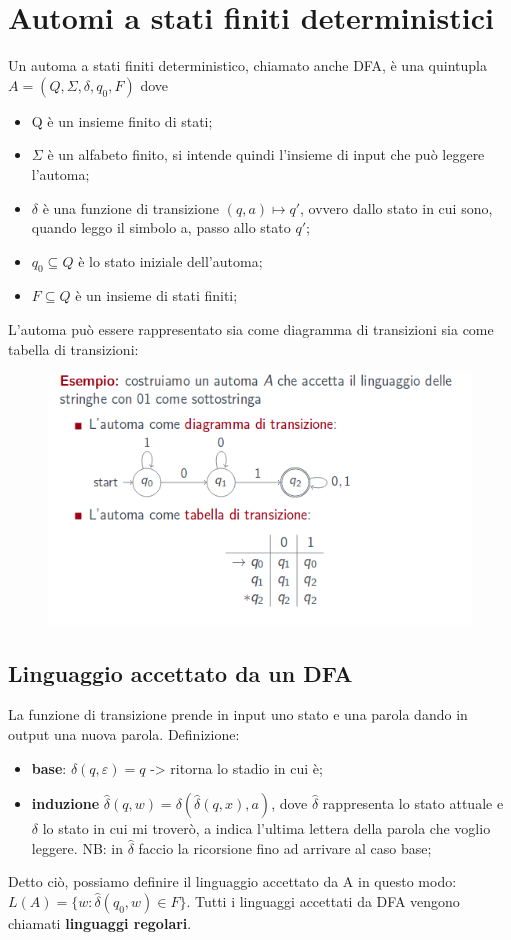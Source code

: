 \chapter{Automi a stati finiti deterministici}
Un automa a stati finiti deterministico, chiamato anche DFA, è una quintupla
$A=(Q, \Sigma, \delta, q_0, F)$ dove
\begin{itemize}
\item Q è un insieme finito di stati;
\item $\Sigma$ è un alfabeto finito, si intende quindi l'insieme di
input che può leggere l'automa;
\item $\delta$ è una funzione di transizione $(q,a) \mapsto q'$, ovvero 
dallo stato in cui sono, quando leggo il simbolo a, passo allo stato $q'$;
\item $q_0 \subseteq Q$ è lo stato iniziale dell'automa;
\item $F \subseteq Q$ è un insieme di stati finiti;
\end{itemize}
L'automa può essere rappresentato sia come diagramma di transizioni sia come tabella
di transizioni: 

\begin{figure}[h]
\centering 
\includegraphics[scale=0.5]{Immagini/DFA.png}
\end{figure}

\section{Linguaggio accettato da un DFA} 
La funzione di transizione prende in input uno stato e una parola dando in output
una nuova parola. Definizione:
\begin{itemize}
\item \textbf{base}: $\delta(q,\varepsilon)=q$ -> ritorna lo stadio in cui è;
\item \textbf{induzione} $\widehat{\delta}(q,w)=\delta(\widehat{\delta}(q,x),a)$, 
dove $\widehat{\delta}$ rappresenta lo stato attuale e $\delta$ lo stato in cui mi 
troverò, a indica l'ultima lettera della parola che voglio leggere.
NB: in $\widehat{\delta}$ faccio la ricorsione fino ad arrivare al caso base;
\end{itemize}
Detto ciò, possiamo definire il linguaggio accettato da A in questo modo:
$L(A)=\{w: \widehat{\delta}(q_0,w) \in F\}$. Tutti i linguaggi accettati da DFA 
vengono chiamati \textbf{linguaggi regolari}.